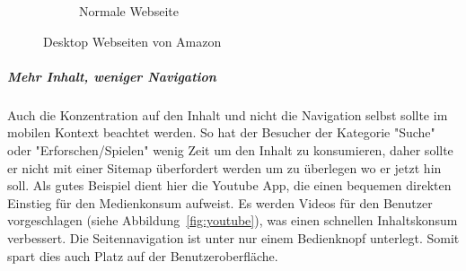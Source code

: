 \begin{figure}
\begin{subfigure}[b]{0.6\textwidth}
		\caption{Normale Webseite}\label{fig:amazonFull}
	\end{subfigure}
	\caption{Desktop Webseiten von Amazon}\label{fig:amazonSites}
\end{figure}

\subparagraph{Mehr Inhalt, weniger Navigation} 
\label{subp:entferne_das_fett} 

Auch die Konzentration auf den Inhalt und nicht die Navigation selbst sollte im mobilen Kontext beachtet werden\cite[Seite 52]{mobileFirst}. So hat der Besucher der Kategorie "Suche" oder "Erforschen/Spielen"  wenig Zeit um den Inhalt zu konsumieren, daher sollte er nicht mit einer Sitemap überfordert werden um zu überlegen wo er jetzt hin soll. Als gutes Beispiel dient hier die Youtube App, die einen bequemen direkten Einstieg für den Medienkonsum aufweist. Es werden Videos für den Benutzer vorgeschlagen (siehe Abbildung~\ref{fig:youtube}), was einen schnellen Inhaltskonsum verbessert. Die Seitennavigation ist unter nur einem Bedienknopf unterlegt. Somit spart dies auch Platz auf der Benutzeroberfläche.

